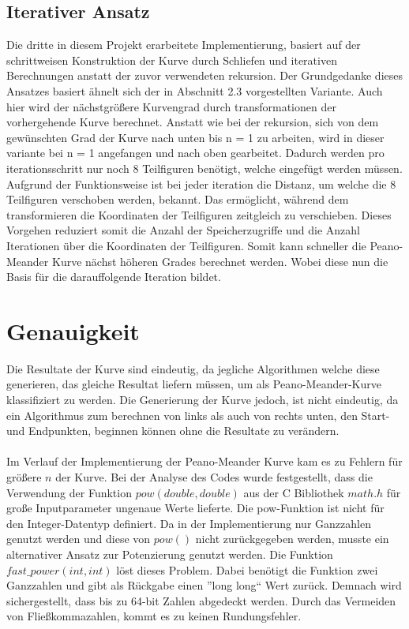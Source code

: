 \documentclass[course=erap]{aspdoc}
\begin{document}
\subsection{Iterativer Ansatz}
Die dritte in diesem Projekt erarbeitete Implementierung, basiert auf der schrittweisen Konstruktion der Kurve durch Schliefen und iterativen Berechnungen anstatt der zuvor verwendeten rekursion.
Der Grundgedanke dieses Ansatzes basiert ähnelt sich der in Abschnitt 2.3 vorgestellten Variante. Auch hier wird der nächstgrößere Kurvengrad durch transformationen der vorhergehende Kurve berechnet. Anstatt wie bei der rekursion, sich von dem gewünschten Grad der Kurve nach unten bis n = 1 zu arbeiten, wird in dieser variante bei n = 1 angefangen und nach oben gearbeitet. Dadurch werden pro iterationsschritt nur noch 8 Teilfiguren benötigt, welche eingefügt werden müssen.  Aufgrund der Funktionsweise ist bei jeder iteration die Distanz, um welche die 8 Teilfiguren verschoben werden, bekannt. Das ermöglicht, während dem transformieren die Koordinaten der Teilfiguren zeitgleich zu verschieben. Dieses Vorgehen reduziert somit die Anzahl der Speicherzugriffe und die Anzahl Iterationen über die Koordinaten der Teilfiguren. Somit kann schneller die Peano-Meander Kurve nächst höheren Grades berechnet werden. Wobei diese nun die Basis für die darauffolgende Iteration bildet.



\section{Genauigkeit}
Die Resultate der Kurve sind eindeutig, da jegliche Algorithmen welche diese generieren, das gleiche Resultat liefern müssen, um als Peano-Meander-Kurve klassifiziert zu werden. Die Generierung der Kurve jedoch, ist nicht eindeutig, da ein Algorithmus zum berechnen von links als auch von rechts unten, den Start- und Endpunkten, beginnen können ohne die Resultate zu verändern.\\
\\
Im Verlauf der Implementierung der Peano-Meander Kurve kam es zu Fehlern für größere \(n\) der Kurve. Bei der Analyse des Codes wurde festgestellt, dass die Verwendung der Funktion \(pow(double, double)\) aus der C Bibliothek \(math.h\) für große Inputparameter ungenaue Werte lieferte. Die pow-Funktion ist nicht für den Integer-Datentyp definiert. Da in der Implementierung nur Ganzzahlen genutzt werden und diese von \(pow()\) nicht zurückgegeben werden, musste ein alternativer Ansatz zur Potenzierung genutzt werden. Die Funktion \(fast\_power(int, int)\) löst dieses Problem. Dabei benötigt die Funktion zwei Ganzzahlen und gibt als Rückgabe einen ''long long`` Wert zurück. Demnach wird sichergestellt, dass bis zu 64-bit Zahlen abgedeckt werden. Durch das Vermeiden von Fließkommazahlen, kommt es zu keinen Rundungsfehler.
\end{document}
